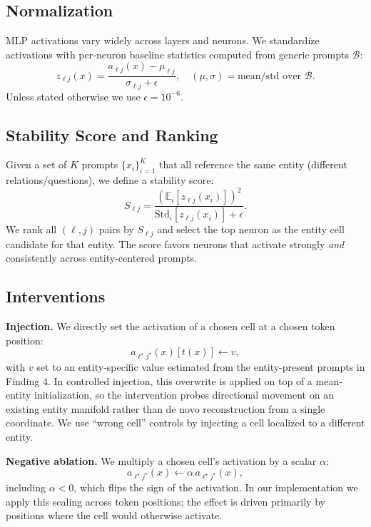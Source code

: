 \documentclass[10pt,twocolumn]{article}
\begin{document}
\subsection{Normalization}
MLP activations vary widely across layers and neurons. We standardize activations with per-neuron baseline statistics computed from generic prompts $\mathcal{B}$:
\begin{equation}
z_{\ell j}(x) = \frac{a_{\ell j}(x) - \mu_{\ell j}}{\sigma_{\ell j} + \epsilon},
\quad (\mu,\sigma)=\text{mean/std over }\mathcal{B}.
\end{equation}
Unless stated otherwise we use $\epsilon=10^{-6}$.

\subsection{Stability Score and Ranking}
Given a set of $K$ prompts $\{x_i\}_{i=1}^K$ that all reference the same entity (different relations/questions), we define a stability score:
\begin{equation}
S_{\ell j} = \frac{\left(\mathbb{E}_i[z_{\ell j}(x_i)]\right)^2}{\mathrm{Std}_i[z_{\ell j}(x_i)] + \epsilon}.
\end{equation}
We rank all $(\ell,j)$ pairs by $S_{\ell j}$ and select the top neuron as the entity cell candidate for that entity. The score favors neurons that activate strongly \emph{and} consistently across entity-centered prompts.

\subsection{Interventions}
\textbf{Injection.} We directly set the activation of a chosen cell at a chosen token position:
\begin{equation}
a_{\ell^\star j^\star}(x)[t(x)] \leftarrow v,
\end{equation}
with $v$ set to an entity-specific value estimated from the entity-present prompts in Finding 4. In controlled injection, this overwrite is applied on top of a mean-entity initialization, so the intervention probes directional movement on an existing entity manifold rather than de novo reconstruction from a single coordinate. We use ``wrong cell'' controls by injecting a cell localized to a different entity.

\textbf{Negative ablation.} We multiply a chosen cell's activation by a scalar $\alpha$:
\begin{equation}
a_{\ell^\star j^\star}(x) \leftarrow \alpha \, a_{\ell^\star j^\star}(x),
\end{equation}
including $\alpha<0$, which flips the sign of the activation. In our implementation we apply this scaling across token positions; the effect is driven primarily by positions where the cell would otherwise activate.
\end{document}
